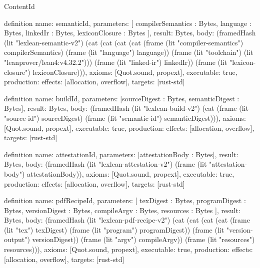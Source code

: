 \begin{lexlean}{ContentId}
\begin{semanticmodule}
definition{
  name: semanticId,
  parameters: [
    compilerSemantics : Bytes,
    language : Bytes,
    linkedIr : Bytes,
    lexiconClosure : Bytes
  ],
  result: Bytes,
  body: (framedHash (lit "lexlean-semantic-v2") (cat (cat (cat (cat (frame (lit "compiler-semantics") compilerSemantics) (frame (lit "language") language)) (frame (lit "toolchain") (lit "leanprover/lean4:v4.32.2"))) (frame (lit "linked-ir") linkedIr)) (frame (lit "lexicon-closure") lexiconClosure))),
  axioms: [Quot.sound, propext],
  executable: true,
  production: {effects: [allocation, overflow], targets: [rust-std]}
}

definition{
  name: buildId,
  parameters: [sourceDigest : Bytes, semanticDigest : Bytes],
  result: Bytes,
  body: (framedHash (lit "lexlean-build-v2") (cat (frame (lit "source-id") sourceDigest) (frame (lit "semantic-id") semanticDigest))),
  axioms: [Quot.sound, propext],
  executable: true,
  production: {effects: [allocation, overflow], targets: [rust-std]}
}

definition{
  name: attestationId,
  parameters: [attestationBody : Bytes],
  result: Bytes,
  body: (framedHash (lit "lexlean-attestation-v2") (frame (lit "attestation-body") attestationBody)),
  axioms: [Quot.sound, propext],
  executable: true,
  production: {effects: [allocation, overflow], targets: [rust-std]}
}

definition{
  name: pdfRecipeId,
  parameters: [
    texDigest : Bytes,
    programDigest : Bytes,
    versionDigest : Bytes,
    compileArgv : Bytes,
    resources : Bytes
  ],
  result: Bytes,
  body: (framedHash (lit "lexlean-pdf-recipe-v2") (cat (cat (cat (cat (frame (lit "tex") texDigest) (frame (lit "program") programDigest)) (frame (lit "version-output") versionDigest)) (frame (lit "argv") compileArgv)) (frame (lit "resources") resources))),
  axioms: [Quot.sound, propext],
  executable: true,
  production: {effects: [allocation, overflow], targets: [rust-std]}
}
\end{semanticmodule}
\end{lexlean}
